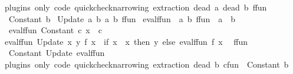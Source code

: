 \begin{isabellebody}
{}
\isamarkuptrue%
%
\endisatagdocument
{\isafolddocument}%
%
\isadelimdocument
%
\endisadelimdocument
{}\isamarkupfalse%
\ {\isacharparenleft}{\kern0pt}plugins\ only{\isacharcolon}{\kern0pt}\ code\ quickcheck{\isacharunderscore}{\kern0pt}narrowing\ extraction{\isacharparenright}{\kern0pt}\ {\isacharparenleft}{\kern0pt}dead\ {\isacharprime}{\kern0pt}a{\isacharcomma}{\kern0pt}\ dead\ {\isacharprime}{\kern0pt}b{\isacharparenright}{\kern0pt}\ ffun\ {\isacharequal}{\kern0pt}\isanewline
\ \ Constant\ {\isacharprime}{\kern0pt}b\isanewline
{\isacharbar}{\kern0pt}\ Update\ {\isacharprime}{\kern0pt}a\ {\isacharprime}{\kern0pt}b\ {\isachardoublequoteopen}{\isacharparenleft}{\kern0pt}{\isacharprime}{\kern0pt}a{\isacharcomma}{\kern0pt}\ {\isacharprime}{\kern0pt}b{\isacharparenright}{\kern0pt}\ ffun{\isachardoublequoteclose}\isanewline
\isanewline
{}\isamarkupfalse%
\ eval{\isacharunderscore}{\kern0pt}ffun\ {\isacharcolon}{\kern0pt}{\isacharcolon}{\kern0pt}\ {\isachardoublequoteopen}{\isacharparenleft}{\kern0pt}{\isacharprime}{\kern0pt}a{\isacharcomma}{\kern0pt}\ {\isacharprime}{\kern0pt}b{\isacharparenright}{\kern0pt}\ ffun\ {\isacharequal}{\kern0pt}{\isachargreater}{\kern0pt}\ {\isacharprime}{\kern0pt}a\ {\isacharequal}{\kern0pt}{\isachargreater}{\kern0pt}\ {\isacharprime}{\kern0pt}b{\isachardoublequoteclose}\isanewline
{}\isanewline
\ \ {\isachardoublequoteopen}eval{\isacharunderscore}{\kern0pt}ffun\ {\isacharparenleft}{\kern0pt}Constant\ c{\isacharparenright}{\kern0pt}\ x\ {\isacharequal}{\kern0pt}\ c{\isachardoublequoteclose}\isanewline
{\isacharbar}{\kern0pt}\ {\isachardoublequoteopen}eval{\isacharunderscore}{\kern0pt}ffun\ {\isacharparenleft}{\kern0pt}Update\ x{\isacharprime}{\kern0pt}\ y\ f{\isacharparenright}{\kern0pt}\ x\ {\isacharequal}{\kern0pt}\ {\isacharparenleft}{\kern0pt}if\ x\ {\isacharequal}{\kern0pt}\ x{\isacharprime}{\kern0pt}\ then\ y\ else\ eval{\isacharunderscore}{\kern0pt}ffun\ f\ x{\isacharparenright}{\kern0pt}{\isachardoublequoteclose}\isanewline
\isanewline
{}\isamarkupfalse%
\ {\isacharparenleft}{\kern0pt}\ ffun\isanewline
{}\isamarkupfalse%
\ {\isacharparenleft}{\kern0pt}\ Constant\ Update\ eval{\isacharunderscore}{\kern0pt}ffun\isanewline
\isanewline
{}\isamarkupfalse%
\ {\isacharparenleft}{\kern0pt}plugins\ only{\isacharcolon}{\kern0pt}\ code\ quickcheck{\isacharunderscore}{\kern0pt}narrowing\ extraction{\isacharparenright}{\kern0pt}\ {\isacharparenleft}{\kern0pt}dead\ {\isacharprime}{\kern0pt}b{\isacharparenright}{\kern0pt}\ cfun\ {\isacharequal}{\kern0pt}\ Constant\ {\isacharprime}{\kern0pt}b\isanewline

\end{isabellebody}
